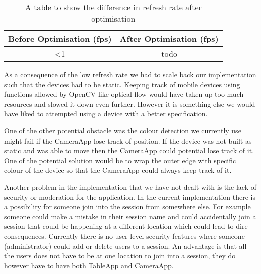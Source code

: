 \begin{table}[h]
\centering
\begin{tabular}{|c|c|}
\hline 
Before Optimisation (fps) & After Optimisation (fps)\tabularnewline
\hline 
\hline 
 \textless 1 & todo 
\tabularnewline
\hline 
\end{tabular}
\caption{A table to show the difference in refresh rate after optimisation}
\label{refresh_rate_table}
\end{table}
As a consequence of the low refresh rate we had to scale back our implementation such that the devices had to be static. Keeping track of mobile devices using functions allowed by OpenCV like optical flow would have taken up too much resources and slowed it down even further. However it is something else we would have liked to attempted using a device with a better specification.

One of the other potential obstacle was the colour detection we currently use might fail if the CameraApp lose track of position. If the device was not built as static and was able to move then the CameraApp could potential lose track of it. One of the potential solution would be to wrap the outer edge with specific colour of the device so that the CameraApp could always keep track of it.

Another problem in the implementation that we have not dealt with is the lack of security or moderation for the application. In the current implementation there is a possibility for someone join into the session from somewhere else. For example someone could make a mistake in their session name and could accidentally join a session that could be happening at a different location which could lead to dire consequences. Currently there is no user level security features where someone (administrator) could add or delete users to a session. An advantage is that all the users does not have to be at one location to join into a session, they do however have to have both TableApp and CameraApp. 
